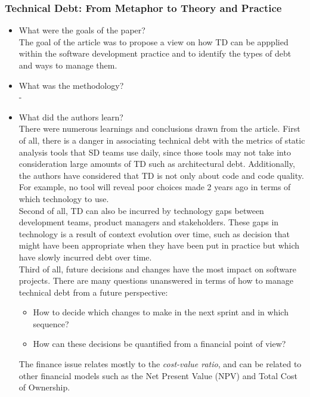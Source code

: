 \documentclass{mprop}
\begin{document}
\subsubsection{Technical Debt: From Metaphor to Theory and Practice} \cite{Kruchten2012}
\begin{itemize}
	\item What were the goals of the paper? \\
	      The goal of the article was to propose a view on how TD can be appplied within the software development practice and to identify the types of debt and ways to manage them.
	\item What was the methodology? \\
	      -
	\item What did the authors learn? \\
	      There were numerous learnings and conclusions drawn from the article.
	      First of all, there is a danger in associating technical debt with the metrics of static analysis tools that SD teams use daily, since those tools may not take into consideration large amounts of TD such as architectural debt.
	      Additionally, the authors have considered that TD is not only about code and code quality. For example, no tool will reveal poor choices made 2 years ago in terms of which technology to use. \\

	      Second of all, TD can also be incurred by technology gaps between development teams, product managers and stakeholders.
	      These gaps in technology is a result of context evolution over time, such as decision that might have been appropriate when they have been put in practice but which have slowly incurred debt over time.\\

	      Third of all, future decisions and changes have the most impact on software projects.
	      There are many questions unanswered in terms of how to manage technical debt from a future perspective:
	      \begin{itemize}
		      \item How to decide which changes to make in the next sprint and in which sequence?
		      \item How can these decisions be quantified from a financial point of view?
	      \end{itemize}
	      The finance issue relates mostly to the \textit{cost-value ratio}, and can be related to other financial models such as the Net Present Value (NPV) and Total Cost of Ownership.


\end{itemize}
\end{document}

